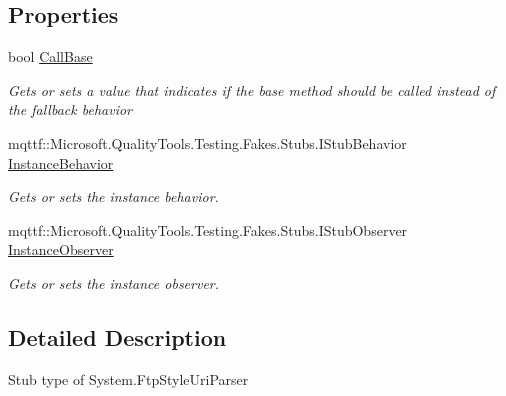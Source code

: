 \subsection*{Properties}
\begin{DoxyCompactItemize}
\item 
bool \hyperlink{class_system_1_1_fakes_1_1_stub_ftp_style_uri_parser_a409869927304ec5aa3779d5c53128854}{Call\-Base}
\begin{DoxyCompactList}\small\item\em Gets or sets a value that indicates if the base method should be called instead of the fallback behavior\end{DoxyCompactList}\item 
mqttf\-::\-Microsoft.\-Quality\-Tools.\-Testing.\-Fakes.\-Stubs.\-I\-Stub\-Behavior \hyperlink{class_system_1_1_fakes_1_1_stub_ftp_style_uri_parser_a0637317330717cc540ede70520b4fa0c}{Instance\-Behavior}
\begin{DoxyCompactList}\small\item\em Gets or sets the instance behavior.\end{DoxyCompactList}\item 
mqttf\-::\-Microsoft.\-Quality\-Tools.\-Testing.\-Fakes.\-Stubs.\-I\-Stub\-Observer \hyperlink{class_system_1_1_fakes_1_1_stub_ftp_style_uri_parser_a0c4db71e063a463f8ec69097f6f1cfef}{Instance\-Observer}
\begin{DoxyCompactList}\small\item\em Gets or sets the instance observer.\end{DoxyCompactList}\end{DoxyCompactItemize}


\subsection{Detailed Description}
Stub type of System.\-Ftp\-Style\-Uri\-Parser



